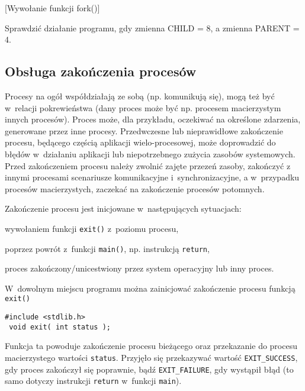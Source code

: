 \begin{example}{[Wywołanie funkcji fork()]}
  \label{ex:HP9M8}
  

  Sprawdzić działanie programu, gdy zmienna CHILD = 8, a zmienna PARENT = 4.
\end{example}

\subsection{Obsługa zakończenia procesów}

Procesy na ogół współdziałają ze sobą (np. komunikują się), mogą też być
w~relacji pokrewieństwa (dany proces może być np. procesem macierzystym innych
procesów). Proces może, dla przykładu, oczekiwać na określone zdarzenia,
generowane przez inne procesy. Przedwczesne lub nieprawidłowe zakończenie
procesu, będącego częścią aplikacji wielo-procesowej, może doprowadzić do
błędów w~działaniu aplikacji lub niepotrzebnego zużycia zasobów systemowych.
Przed zakończeniem procesu należy zwolnić zajęte przezeń zasoby, zakończyć z
innymi procesami scenariusze komunikacyjne i~synchronizacyjne, a w~przypadku
procesów macierzystych, zaczekać na zakończenie procesów potomnych.

Zakończenie procesu jest inicjowane w~następujących sytuacjach:
\begin{myitemize}
  \item wywołaniem funkcji \texttt{exit()} z~poziomu procesu,
  \item poprzez powrót z~funkcji \texttt{main()}, np. instrukcją \texttt{return},
  \item proces zakończony/unicestwiony przez system operacyjny lub inny proces.
\end{myitemize}

W~dowolnym miejscu programu można zainicjować zakończenie procesu funkcją \texttt{exit()}
\begin{lstlisting}[style=MyCStyle]
 #include <stdlib.h>
 void exit( int status );
\end{lstlisting}
Funkcja ta powoduje zakończenie procesu bieżącego oraz przekazanie do procesu
macierzystego wartości \texttt{status}. Przyjęło się przekazywać wartość
\texttt{EXIT\_SUCCESS}, gdy proces zakończył się poprawnie, bądź
\texttt{EXIT\_FAILURE}, gdy wystąpił błąd (to samo dotyczy instrukcji
\texttt{return} w~funkcji \texttt{main}).

